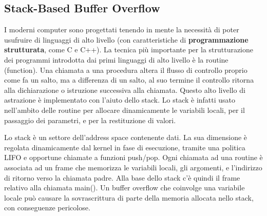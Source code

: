 \subsection{Stack-Based Buffer Overflow}
I moderni computer sono progettati tenendo in mente la necessità di poter usufruire di linguaggi di alto livello (con caratteristiche di \textbf{programmazione strutturata}, come C e C++). La tecnica più importante per la strutturazione dei programmi introdotta dai primi linguaggi di alto livello è la routine (function). Una chiamata a una procedura altera il flusso di controllo proprio come fa un salto, ma a differenza di un salto, al suo termine il controllo ritorna alla dichiarazione o istruzione successiva alla chiamata. Questo alto livello di astrazione è implementato con l'aiuto dello stack. Lo stack è infatti usato nell'ambito delle routine per allocare dinamicamente le variabili locali, per il passaggio dei parametri, e per la restituzione di valori. \newline \newline

Lo stack è un settore dell'address space contenente dati. La sua dimensione è regolata dinamicamente dal kernel
in fase di esecuzione, tramite una politica LIFO e opportune chiamate a funzioni push/pop. Ogni chiamata ad una routine è associata ad un frame che memorizza le variabili locali, gli argomenti, e l'indirizzo di ritorno verso la chiamata padre. Alla base dello stack c'è quindi il frame relativo alla chiamata main(). Un buffer overflow che coinvolge una variabile locale può causare la sovrascrittura di parte della memoria allocata nello stack, con conseguenze pericolose. \newline \newline

